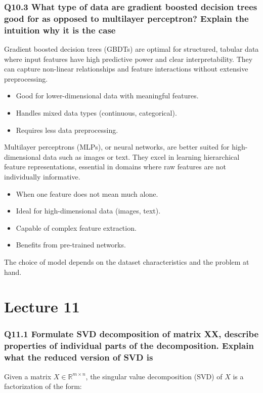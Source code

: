 \documentclass[11pt]{article}
\begin{document}
\section{Q10.3 What type of data are gradient boosted decision trees good for as opposed to multilayer perceptron? Explain the intuition why it is the case}


Gradient boosted decision trees (GBDTs) are optimal for structured, tabular data where input features have high predictive power and clear interpretability. They can capture non-linear relationships and feature interactions without extensive preprocessing.

\begin{itemize}
    \item Good for lower-dimensional data with meaningful features.
    \item Handles mixed data types (continuous, categorical).
    \item Requires less data preprocessing.
\end{itemize}

Multilayer perceptrons (MLPs), or neural networks, are better suited for high-dimensional data such as images or text. They excel in learning hierarchical feature representations, essential in domains where raw features are not individually informative.

\begin{itemize}
    \item When one feature does not mean much alone.
    \item Ideal for high-dimensional data (images, text).
    \item Capable of complex feature extraction.
    \item Benefits from pre-trained networks.
\end{itemize}

The choice of model depends on the dataset characteristics and the problem at hand.

\part{Lecture 11}
\section{Q11.1 Formulate SVD decomposition of matrix XX, describe properties of individual parts of the decomposition. Explain what the reduced version of SVD is}

Given a matrix \( X \in \mathbb{R}^{m \times n} \), the singular value decomposition (SVD) of \( X \) is a factorization of the form:
\end{document}
